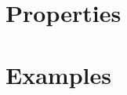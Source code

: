 \documentclass[11pt]{article}
\theoremstyle{plain}
\begin{document}
\section{Properties}

\section{Examples}









\end{document}
